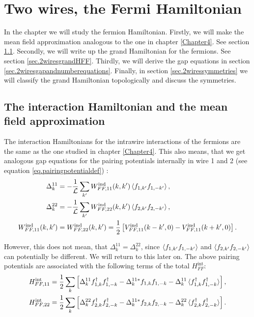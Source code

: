 
\chapter{Two wires, the Fermi Hamiltonian} %

\label{Chapter9} %


In the chapter we will study the fermion Hamiltonian. Firstly, we will make the mean field approximation analogous to the one in chapter \ref{Chapter4}. See section \ref{sec.2wiresmeanfieldapproximation}. Secondly, we will write up the grand Hamiltonian for the fermions. See section \ref{sec.2wiresgrandHFF}. Thirdly, we will derive the gap equations in section \ref{sec.2wiresgapandnumberequations}. Finally, in section \ref{sec.2wiressymmetries} we will classify the grand Hamiltonian topologically and discuss the symmetries. 

\section{The interaction Hamiltonian and the mean field approximation}
\label{sec.2wiresmeanfieldapproximation}
The interaction Hamiltonians for the intrawire interactions of the fermions are the same as the one studied in chapter \ref{Chapter4}. This also means, that we get analogous gap equations for the pairing potentials internally in wire 1 and 2 (see equation \ref{eq.pairingpotentialdef}) :
\begin{align}
\Delta^{11}_k &= -\frac{1}{\mathcal{L}} \sum_{k'} W^\text{ind}_{FF,11}(k,k')\braket{f_{1,k'}f_{1,-k'}}, \nonumber \\
\Delta^{22}_k &= -\frac{1}{\mathcal{L}} \sum_{k'} W^\text{ind}_{FF,22}(k,k')\braket{f_{2,k'}f_{2,-k'}}, \nonumber \\
W^\text{ind}_{FF,11}(k,k') &= W^\text{ind}_{FF,22}(k,k') = \frac{1}{2}\left[V^\text{ind}_{FF,11}(k-k',0) - V^\text{ind}_{FF,11}(k+k',0) \right].
\label{eq.pairingpotentialsintrawire}
\end{align}

However, this does not mean, that $\Delta^{11}_k = \Delta^{22}_k$, since $\braket{f_{1,k'}f_{1,-k'}}$ and $\braket{f_{2,k'}f_{2,-k'}}$ can potentially be different. We will return to this later on. The above pairing potentials are associated with the following terms of the total $H^\text{int}_{FF}$:
\begin{align}
H^\text{int}_{FF,11} &= \frac{1}{2}\sum_k \left[\Delta^{11}_k f^\dagger_{1,k}f^\dagger_{1,-k} - \Delta^{11 *}_k f_{1,k}f_{1,-k} - \Delta^{11}_k\braket{f^\dagger_{1,k}f^\dagger_{1,-k}} \right], \nonumber \\
H^\text{int}_{FF,22} &= \frac{1}{2}\sum_k \left[\Delta^{22}_k f^\dagger_{2,k}f^\dagger_{2,-k} - \Delta^{11 *}_k f_{2,k}f_{2,-k} - \Delta^{22}_k\braket{f^\dagger_{2,k}f^\dagger_{2,-k}} \right].
\label{eq.Hintintrawire}
\end{align}

